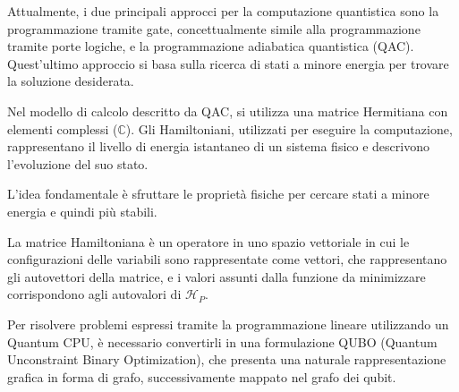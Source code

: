 \documentclass{article}
\begin{document}
Attualmente, i due principali approcci per la computazione quantistica sono la programmazione tramite gate, concettualmente simile alla programmazione tramite porte logiche, e la programmazione adiabatica quantistica (QAC). Quest'ultimo approccio si basa sulla ricerca di stati a minore energia per trovare la soluzione desiderata.

Nel modello di calcolo descritto da QAC, si utilizza una matrice Hermitiana con elementi complessi ($\mathbb{C}$). Gli Hamiltoniani, utilizzati per eseguire la computazione, rappresentano il livello di energia istantaneo di un sistema fisico e descrivono l'evoluzione del suo stato.

L'idea fondamentale è sfruttare le proprietà fisiche per cercare stati a minore energia e quindi più stabili.

La matrice Hamiltoniana è un operatore in uno spazio vettoriale in cui le configurazioni delle variabili sono rappresentate come vettori, che rappresentano gli autovettori della matrice, e i valori assunti dalla funzione da minimizzare corrispondono agli autovalori di $\mathcal{H}_P$. 

Per risolvere problemi espressi tramite la programmazione lineare utilizzando un Quantum CPU, è necessario convertirli in una formulazione QUBO (Quantum Unconstraint Binary Optimization), che presenta una naturale rappresentazione grafica in forma di grafo, successivamente mappato nel grafo dei qubit.
\end{document}
